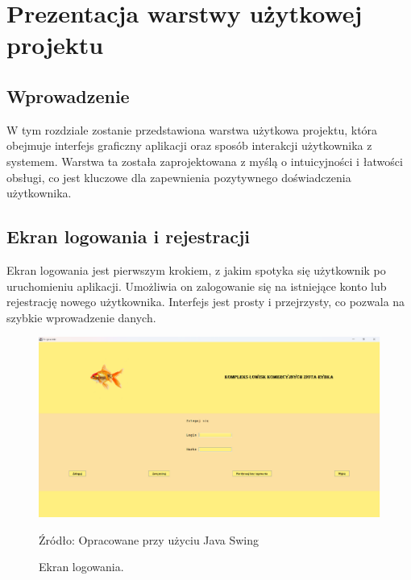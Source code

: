 \chapter{Prezentacja warstwy użytkowej projektu}
\label{chap:prezentacja}
\section*{Wprowadzenie}
W tym rozdziale zostanie przedstawiona warstwa użytkowa projektu, która obejmuje interfejs graficzny aplikacji oraz sposób interakcji użytkownika z systemem. Warstwa ta została zaprojektowana z myślą o intuicyjności i łatwości obsługi, co jest kluczowe dla zapewnienia pozytywnego doświadczenia użytkownika.

\section{Ekran logowania i rejestracji}
Ekran logowania jest pierwszym krokiem, z jakim spotyka się użytkownik po uruchomieniu aplikacji. Umożliwia on zalogowanie się na istniejące konto lub rejestrację nowego użytkownika. Interfejs jest prosty i przejrzysty, co pozwala na szybkie wprowadzenie danych.
\begin{figure}[H]
    \centering
    \includegraphics[width=0.8\linewidth]{figures/login.eps}
    \caption{Ekran logowania.}
    \label{fig:login_screen}
    \small{Źródło: Opracowane przy użyciu Java Swing}
\end{figure}


